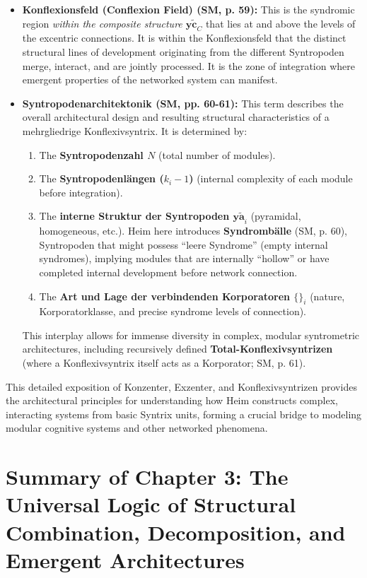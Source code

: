 \documentclass[
    12pt,              %
    a4paper,           %
    headings=normal,   %
    twoside=true,      %
    BCOR=8mm,          %
]{scrbook}
\newcommand{\q}[1]{\enquote{#1}}
\newcommand{\syntrix}{\bm{y\widetilde{a}}}
\newcommand{\konflexivsyntrix}{\bm{y\widetilde{c}}}
\begin{document}
\begin{itemize}
    \item   \textbf{Konflexionsfeld (Conflexion Field) (SM, p. 59):} This is the syndromic region \textit{within the composite structure \(\konflexivsyntrix_C\)} that lies at and above the levels of the excentric connections. It is within the Konflexionsfeld that the distinct structural lines of development originating from the different Syntropoden merge, interact, and are jointly processed. It is the zone of integration where emergent properties of the networked system can manifest.

    \item   \textbf{Syntropodenarchitektonik (SM, pp. 60-61):} This term describes the overall architectural design and resulting structural characteristics of a mehrgliedrige Konflexivsyntrix. It is determined by:
        \begin{enumerate}
            \item  The \textbf{Syntropodenzahl \(N\)} (total number of modules).
            \item  The \textbf{Syntropodenlängen (\(k_i-1\))} (internal complexity of each module before integration).
            \item  The \textbf{interne Struktur der Syntropoden \(\syntrix_i\)} (pyramidal, homogeneous, etc.). Heim here introduces \textbf{Syndrombälle} (SM, p. 60), Syntropoden that might possess \q{leere Syndrome} (empty internal syndromes), implying modules that are internally \q{hollow} or have completed internal development before network connection.
            \item  The \textbf{Art und Lage der verbindenden Korporatoren \(\{ \}_i\)} (nature, Korporatorklasse, and precise syndrome levels of connection).
        \end{enumerate}
        This interplay allows for immense diversity in complex, modular syntrometric architectures, including recursively defined \textbf{Total-Konflexivsyntrizen} (where a Konflexivsyntrix itself acts as a Korporator; SM, p. 61).
\end{itemize}
This detailed exposition of Konzenter, Exzenter, and Konflexivsyntrizen provides the architectural principles for understanding how Heim constructs complex, interacting systems from basic Syntrix units, forming a crucial bridge to modeling modular cognitive systems and other networked phenomena.

\section{Summary of Chapter 3: The Universal Logic of Structural Combination, Decomposition, and Emergent Architectures}
\label{sec:ch3_summary_final} %
\end{document}
